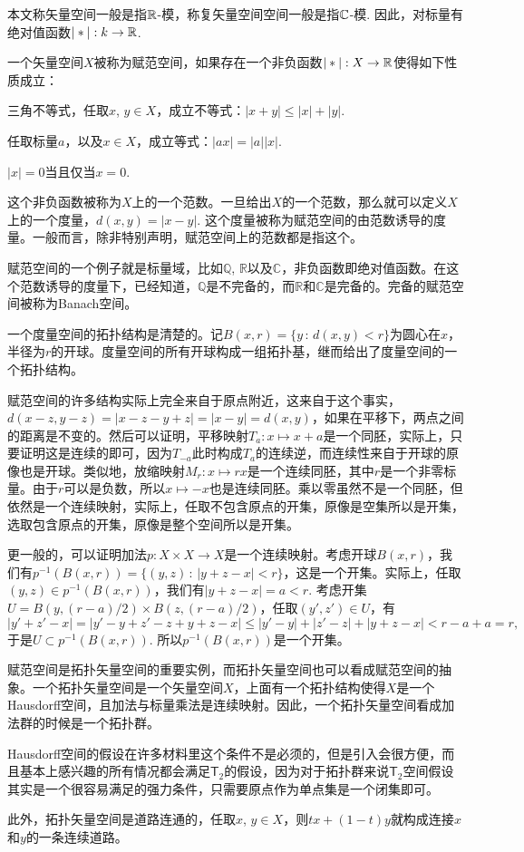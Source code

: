 本文称矢量空间一般是指$\mathbb{R}$-模，称复矢量空间空间一般是指$\mathbb{C}$-模. 因此，对标量有绝对值函数$|*|:k\to \mathbb{R}$.

\begin{para}
一个矢量空间$X$被称为赋范空间，如果存在一个非负函数$|*|:X\to \mathbb{R}$使得如下性质成立：
\begin{compactenum}
\item 三角不等式，任取$x$, $y\in X$，成立不等式：$|x+y|\leq |x|+|y|$.
\item 任取标量$a$，以及$x\in X$，成立等式：$|ax|=|a||x|$.
\item $|x|=0$当且仅当$x=0$.
\end{compactenum}
这个非负函数被称为$X$上的一个范数。一旦给出$X$的一个范数，那么就可以定义$X$上的一个度量，$d(x,y)=|x-y|$. 这个度量被称为赋范空间的由范数诱导的度量。一般而言，除非特别声明，赋范空间上的范数都是指这个。

赋范空间的一个例子就是标量域，比如$\mathbb{Q}$, $\mathbb{R}$以及$\mathbb{C}$，非负函数即绝对值函数。在这个范数诱导的度量下，已经知道，$\mathbb{Q}$是不完备的，而$\mathbb{R}$和$\mathbb{C}$是完备的。完备的赋范空间被称为Banach空间。
\end{para}

\begin{para}
一个度量空间的拓扑结构是清楚的。记$B(x,r)=\{y\,:\, d(x,y)<r\}$为圆心在$x$，半径为$r$的开球。度量空间的所有开球构成一组拓扑基，继而给出了度量空间的一个拓扑结构。

赋范空间的许多结构实际上完全来自于原点附近，这来自于这个事实，$d(x-z,y-z)=|x-z-y+z|=|x-y|=d(x,y)$，如果在平移下，两点之间的距离是不变的。然后可以证明，平移映射$T_a:x\mapsto x+a$是一个同胚，实际上，只要证明这是连续的即可，因为$T_{-a}$此时构成$T_a$的连续逆，而连续性来自于开球的原像也是开球。类似地，放缩映射$M_r:x\mapsto rx$是一个连续同胚，其中$r$是一个非零标量。由于$r$可以是负数，所以$x\mapsto -x$也是连续同胚。乘以零虽然不是一个同胚，但依然是一个连续映射，实际上，任取不包含原点的开集，原像是空集所以是开集，选取包含原点的开集，原像是整个空间所以是开集。

更一般的，可以证明加法$p:X\times X\to X$是一个连续映射。考虑开球$B(x,r)$，我们有$p^{-1}(B(x,r))=\{(y,z)\,:\,|y+z-x|<r\}$，这是一个开集。实际上，任取$(y,z)\in p^{-1}(B(x,r))$，我们有$|y+z-x|=a<r$. 考虑开集$U=B(y,(r-a)/2)\times B(z,(r-a)/2)$，任取$(y',z')\in U$，有
\[
	|y'+z'-x|=\left|y'-y+z'-z+y+z-x\right|\leq |y'-y|+|z'-z|+|y+z-x|<r-a+a=r,
\]
于是$U\subset p^{-1}(B(x,r))$. 所以$p^{-1}(B(x,r))$是一个开集。
\end{para}

\begin{para}
赋范空间是拓扑矢量空间的重要实例，而拓扑矢量空间也可以看成赋范空间的抽象。一个拓扑矢量空间是一个矢量空间$X$，上面有一个拓扑结构使得$X$是一个Hausdorff空间，且加法与标量乘法是连续映射。因此，一个拓扑矢量空间看成加法群的时候是一个拓扑群。

Hausdorff空间的假设在许多材料里这个条件不是必须的，但是引入会很方便，而且基本上感兴趣的所有情况都会满足$\mathsf{T}_2$的假设，因为对于拓扑群来说$\mathsf{T}_2$空间假设其实是一个很容易满足的强力条件，只需要原点作为单点集是一个闭集即可。

此外，拓扑矢量空间是道路连通的，任取$x$, $y\in X$，则$tx+(1-t)y$就构成连接$x$和$y$的一条连续道路。
\end{para}

